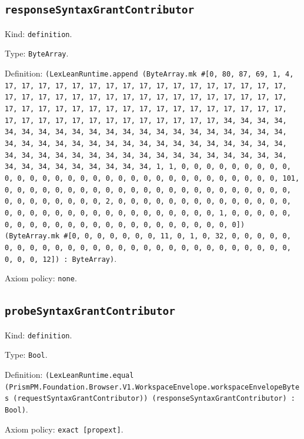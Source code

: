 \documentclass[11pt]{article}
\begin{document}
\subsection*{\texttt{responseSyntaxGrantContributor}}
\noindent Kind: \texttt{definition}.\par
\noindent Type: \texttt{ByteArray}.\par
\noindent Definition: \texttt{(LexLeanRuntime.append (ByteArray.mk \#[0, 80, 87, 69, 1, 4, 17, 17, 17, 17, 17, 17, 17, 17, 17, 17, 17, 17, 17, 17, 17, 17, 17, 17, 17, 17, 17, 17, 17, 17, 17, 17, 17, 17, 17, 17, 17, 17, 17, 17, 17, 17, 17, 17, 17, 17, 17, 17, 17, 17, 17, 17, 17, 17, 17, 17, 17, 17, 17, 17, 17, 17, 17, 17, 17, 17, 17, 17, 17, 17, 34, 34, 34, 34, 34, 34, 34, 34, 34, 34, 34, 34, 34, 34, 34, 34, 34, 34, 34, 34, 34, 34, 34, 34, 34, 34, 34, 34, 34, 34, 34, 34, 34, 34, 34, 34, 34, 34, 34, 34, 34, 34, 34, 34, 34, 34, 34, 34, 34, 34, 34, 34, 34, 34, 34, 34, 34, 34, 34, 34, 34, 34, 34, 34, 1, 1, 0, 0, 0, 0, 0, 0, 0, 0, 0, 0, 0, 0, 0, 0, 0, 0, 0, 0, 0, 0, 0, 0, 0, 0, 0, 0, 0, 0, 0, 0, 0, 101, 0, 0, 0, 0, 0, 0, 0, 0, 0, 0, 0, 0, 0, 0, 0, 0, 0, 0, 0, 0, 0, 0, 0, 0, 0, 0, 0, 0, 0, 0, 0, 2, 0, 0, 0, 0, 0, 0, 0, 0, 0, 0, 0, 0, 0, 0, 0, 0, 0, 0, 0, 0, 0, 0, 0, 0, 0, 0, 0, 0, 0, 0, 0, 1, 0, 0, 0, 0, 0, 0, 0, 0, 0, 0, 0, 0, 0, 0, 0, 0, 0, 0, 0, 0, 0, 0, 0, 0]) (ByteArray.mk \#[0, 0, 0, 0, 0, 0, 0, 11, 0, 1, 0, 32, 0, 0, 0, 0, 0, 0, 0, 0, 0, 0, 0, 0, 0, 0, 0, 0, 0, 0, 0, 0, 0, 0, 0, 0, 0, 0, 0, 0, 0, 0, 0, 12]) : ByteArray)}.\par
\noindent Axiom policy: \texttt{none}.\par
\subsection*{\texttt{probeSyntaxGrantContributor}}
\noindent Kind: \texttt{definition}.\par
\noindent Type: \texttt{Bool}.\par
\noindent Definition: \texttt{(LexLeanRuntime.equal (PrismPM.Foundation.Browser.V1.WorkspaceEnvelope.workspaceEnvelopeBytes (requestSyntaxGrantContributor)) (responseSyntaxGrantContributor) : Bool)}.\par
\noindent Axiom policy: \texttt{exact [propext]}.\par
\end{document}
